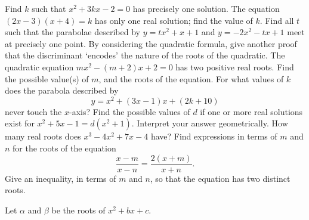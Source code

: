 \begin{questions}
  \question Find $ k $ such that $ x^2 + 3kx - 2 = 0 $ has precisely one solution.
  \question The equation $ (2x - 3)(x + 4) = k $ has only one real solution; find the value of $ k $.
  \question Find all $ t $ such that the parabolae described by $ y = tx^2 + x + 1 $ and $ y = -2x^2 - tx + 1 $ meet at precisely one point.
  \question By considering the quadratic formula, give another proof that the discriminant `encodes' the nature of the roots of the quadratic.
  \question The quadratic equation $ mx^2 - (m + 2)x + 2 = 0 $ has two positive real roots. Find the possible
            value(s) of $ m $, and the roots of the equation.
  \question For what values of $ k $ does the parabola described by
            \begin{displaymath}
              y = x^2 + (3x - 1)x + (2k + 10)
            \end{displaymath}
            never touch the $x$-axis?
  \question Find the possible values of $ d $ if one or more real solutions exist for $ x^2 + 5x - 1 = d(x^2 + 1) $. Interpret
            your answer geometrically.
  \question How many real roots does $ x^3 - 4x^2 + 7x - 4 $ have?
  \question Find expressions in terms of $ m $ and $ n $ for the roots of the equation
            \begin{displaymath}
              \frac{x - m}{x - n} = \frac{2(x + m)}{x + n}.
            \end{displaymath}
            Give an inequality, in terms of $ m $ and $ n $, so that the equation has two distinct roots.
  \question
  \question Let $ \alpha $ and $ \beta $ be the roots of $ x^2 + bx + c $.
\end{questions}



